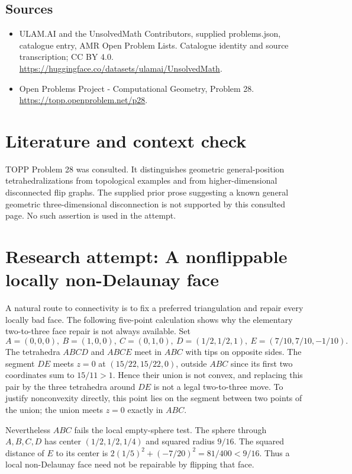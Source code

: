 \documentclass[11pt,a4paper]{article}
\begin{document}
\subsection{Sources}
\begin{itemize}
\item[S1] ULAM.AI and the UnsolvedMath Contributors, supplied problems.json, catalogue entry, AMR Open Problem Lists. Catalogue identity and source transcription; CC BY 4.0.
\url{https://huggingface.co/datasets/ulamai/UnsolvedMath}.
\item[S2] Open Problems Project - Computational Geometry, Problem 28. 
\url{https://topp.openproblem.net/p28}.
\end{itemize}

\section{Literature and context check}
TOPP Problem 28 was consulted. It distinguishes geometric general-position
tetrahedralizations from topological examples and from higher-dimensional
disconnected flip graphs. The supplied prior prose suggesting a known general
geometric three-dimensional disconnection is not supported by this consulted page.
No such assertion is used in the attempt.
\section{Research attempt: A nonflippable locally non-Delaunay face}
A natural route to connectivity is to fix a preferred triangulation and repair
every locally bad face. The following five-point calculation shows why the
elementary two-to-three face repair is not always available. Set
\[
 A=(0,0,0),\ B=(1,0,0),\ C=(0,1,0),\
 D=(1/2,1/2,1),\ E=(7/10,7/10,-1/10).
\]
The tetrahedra $ABCD$ and $ABCE$ meet in $ABC$ with tips on opposite sides.
The segment $DE$ meets $z=0$ at $(15/22,15/22,0)$, outside $ABC$ since
its first two coordinates sum to $15/11>1$. Hence their union is not convex,
and replacing this pair by the three tetrahedra around $DE$ is not a legal
two-to-three move. To justify nonconvexity directly, this point lies on the
segment between two points of the union; the union meets $z=0$ exactly in $ABC$.

Nevertheless $ABC$ fails the local empty-sphere test. The sphere through
$A,B,C,D$ has center $(1/2,1/2,1/4)$ and squared radius $9/16$.
The squared distance of $E$ to its center is
$2(1/5)^2+(-7/20)^2=81/400<9/16$. Thus a local non-Delaunay face need not
be repairable by flipping that face.
\end{document}
